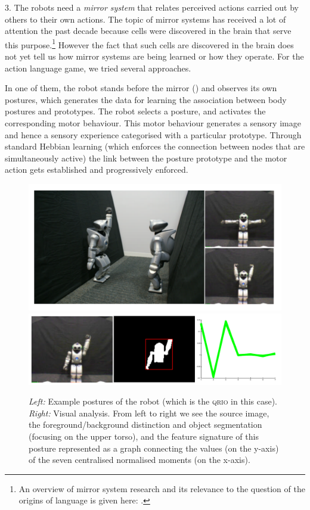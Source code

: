 3. The robots need a {\itshape mirror system} that relates perceived actions carried out by others to their own actions. 
The topic of mirror systems has received a lot of attention the past decade because cells were discovered in the brain 
that serve this purpose.\footnote{
An overview of mirror system research and its relevance to the question of the origins of language is given here: 
\cite{Rizzolatti:1998}.}
However the fact that such cells are discovered in the brain 
does not yet tell us how mirror systems are being learned or how they operate. For the action language game, we tried 
several approaches.

\enlargethispage{1\baselineskip}
In one of them, the robot stands before the mirror () and observes its own 
postures, which generates the data for learning the association between body postures and prototypes. 
The robot selects a posture, and activates the corresponding motor behaviour. This motor behaviour generates a sensory image and 
hence a sensory experience categorised with a particular prototype. Through standard Hebbian learning (which enforces the 
connection between nodes that are simultaneously active) the link between the posture prototype and the motor action gets 
established and progressively enforced. 
\clearpage
\begin{figure}[p]
\centerline{\includegraphics[width=0.2\linewidth]{chap11/figs/postures.pdf}\includegraphics[width=0.75\linewidth]{chap11/figs/vision_2.pdf}}
\caption{\label{vision}{\itshape Left:} Example postures of the robot (which is the \textsc{qrio} in this case).
{\itshape Right:} Visual analysis. From left to right we see the source image, the foreground/background distinction and object segmentation (focusing on the upper torso), and the feature signature of this posture represented as a graph connecting the values (on the y-axis)
of the seven centralised normalised moments (on the x-axis).}
\end{figure}

